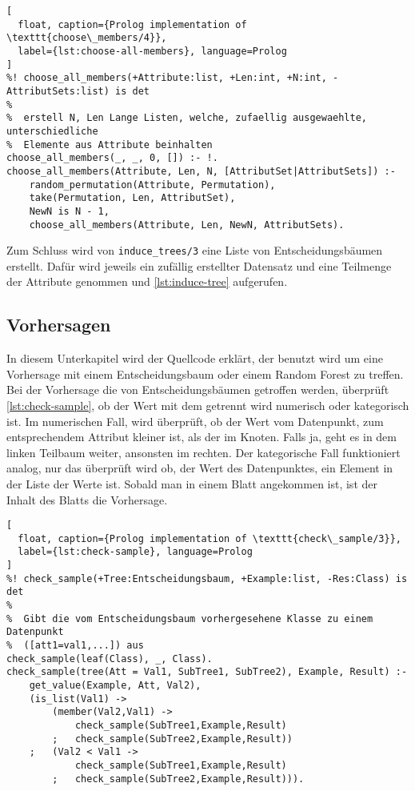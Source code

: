 \begin{lstlisting}[
  float, caption={Prolog implementation of \texttt{choose\_members/4}},
  label={lst:choose-all-members}, language=Prolog
]
%! choose_all_members(+Attribute:list, +Len:int, +N:int, -AttributSets:list) is det
%
%  erstell N, Len Lange Listen, welche, zufaellig ausgewaehlte, unterschiedliche
%  Elemente aus Attribute beinhalten
choose_all_members(_, _, 0, []) :- !.
choose_all_members(Attribute, Len, N, [AttributSet|AttributSets]) :-
    random_permutation(Attribute, Permutation),
    take(Permutation, Len, AttributSet),
    NewN is N - 1,
    choose_all_members(Attribute, Len, NewN, AttributSets).
\end{lstlisting}

Zum Schluss wird von \texttt{induce\_trees/3} eine Liste von Entscheidungsbäumen erstellt.
Dafür wird jeweils ein zufällig erstellter Datensatz und eine Teilmenge der Attribute genommen
und \cref{lst:induce-tree} aufgerufen.

\subsection{Vorhersagen}
In diesem Unterkapitel wird der Quellcode erklärt, der benutzt wird um eine
Vorhersage mit einem Entscheidungsbaum oder einem Random Forest zu treffen.
Bei der Vorhersage die von Entscheidungsbäumen getroffen werden, überprüft \cref{lst:check-sample},
ob der Wert mit dem getrennt wird numerisch oder kategorisch ist. Im numerischen Fall,
wird überprüft, ob der Wert vom Datenpunkt, zum entsprechendem Attribut kleiner ist,
als der im Knoten. Falls ja, geht es in dem linken Teilbaum weiter, ansonsten im rechten.
Der kategorische Fall funktioniert analog, nur das überprüft wird ob, der Wert des Datenpunktes,
ein Element in der Liste der Werte ist.
Sobald man in einem Blatt angekommen ist, ist der Inhalt des Blatts die Vorhersage.

\begin{lstlisting}[
  float, caption={Prolog implementation of \texttt{check\_sample/3}},
  label={lst:check-sample}, language=Prolog
]
%! check_sample(+Tree:Entscheidungsbaum, +Example:list, -Res:Class) is det
%
%  Gibt die vom Entscheidungsbaum vorhergesehene Klasse zu einem Datenpunkt
%  ([att1=val1,...]) aus
check_sample(leaf(Class), _, Class).
check_sample(tree(Att = Val1, SubTree1, SubTree2), Example, Result) :-
    get_value(Example, Att, Val2),
    (is_list(Val1) ->
        (member(Val2,Val1) ->
            check_sample(SubTree1,Example,Result)
        ;   check_sample(SubTree2,Example,Result))
    ;   (Val2 < Val1 ->
            check_sample(SubTree1,Example,Result)
        ;   check_sample(SubTree2,Example,Result))).
\end{lstlisting}

